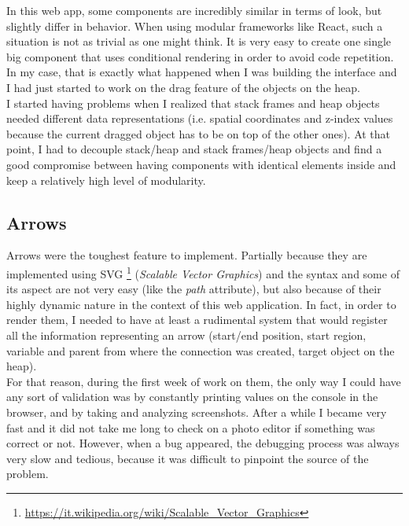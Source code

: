 \documentclass[]{usiinfbachelorproject}
\begin{document}
In this web app, some components are incredibly similar in terms of look, but slightly differ in behavior. When using modular frameworks like React, such a situation is not as trivial as one might think. It is very easy to create one single big component that uses conditional rendering in order to avoid code repetition. In my case, that is exactly what happened when I was building the interface and I had just started to work on the drag feature of the objects on the heap.\\ I started having problems when I realized that stack frames and heap objects needed different data representations (i.e. spatial coordinates and z-index values because the current dragged object has to be on top of the other ones). At that point, I had to decouple stack/heap and stack frames/heap objects and find a good compromise between having components with identical elements inside and keep a relatively high level of modularity.

\subsection{Arrows}

Arrows were the toughest feature to implement. Partially because they are implemented using SVG \footnote{\url{https://it.wikipedia.org/wiki/Scalable_Vector_Graphics}} (\emph{Scalable Vector Graphics}) and the syntax and some of its aspect are not very easy (like the \emph{path} attribute), but also because of their highly dynamic nature in the context of this web application. In fact, in order to render them, I needed to have at least a rudimental system that would register all the information representing an arrow (start/end position, start region, variable and parent from where the connection was created, target object on the heap).\\For that reason, during the first week of work on them, the only way I could have any sort of validation was by constantly printing values on the console in the browser, and by taking and analyzing screenshots. After a while I became very fast and it did not take me long to check on a photo editor if something was correct or not. However, when a bug appeared, the debugging process was always very slow and tedious, because it was difficult to pinpoint the source of the problem.\\
\end{document}
